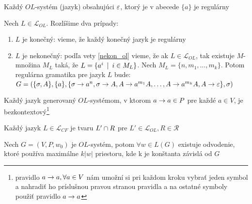 \begin{veta}
    Každý $OL$-systém (jazyk) obsahujúci $\varepsilon$, ktorý je v
    abecede $\{a\}$ je regulárny
\end{veta}

\begin{dokaz}
    Nech $L\in\mathcal{L}_{OL}$. Rozlíšime dva prípady:
    \begin{enumerate}
    \item $L$ je konečný: vieme, že každý konečný jazyk je regulárny
    \item $L$ je nekonečný: podľa vety \ref{nekon_ol} vieme, že ak
        $L\in\mathcal{L}_{OL}$, tak existuje $M$-množina $M_L$ taká, že
        $L=\{a^i\enspace |\enspace i\in M_L\}$. Nech $M_L=\{n,m_1,\dots,m_k\}$. Potom
        regulárna gramatika pre jazyk $L$ bude:
        $G=(\{\sigma,A\},\{a\},\{\sigma\rightarrow a^n,\sigma\rightarrow A,A\rightarrow
        a^{m_1}A,\dots,A\rightarrow a^{m_k}A,A\rightarrow \varepsilon\},\sigma)$
    \end{enumerate}
\end{dokaz}

\begin{poznamka}
    Každý jazyk generovaný $OL$-systémom, v ktorom $a\rightarrow a\in P$ pre
    každé $a\in V$, je bezkontextový\footnote{pravidlo $a\rightarrow a,\forall
    a\in V$ nám umožní si pri každom kroku vybrať jeden symbol a
    nahradiť ho príslušnou pravou stranou pravidla a na ostatné
    symboly použiť pravidlo $a\rightarrow a$}
\end{poznamka}

\begin{poznamka}
    Každý jazyk $L\in\mathcal{L}_{CF}$ je tvaru $L'\cap R$ pre
    $L'\in\mathcal{L}_{OL},R\in\mathcal{R}$
\end{poznamka}

\begin{lema}
    \label{linear} Nech $G=(V,P,w_0)$ je $OL$-systém, potom $\forall
    w\in L(G)$ existuje odvodenie, ktoré používa ma\-xi\-mál\-ne
    $k|w|$ priestoru, kde k je konštanta závislá od $G$
\end{lema}


